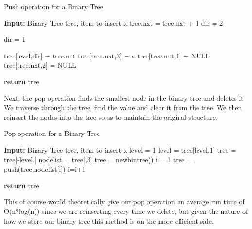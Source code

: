 \documentclass[11pt]{article}
\begin{document}
\begin{algorithm}[H]
    \caption{Push operation for a Binary Tree}
    \begin{algorithmic}[1]
        \State \textbf{Input: } Binary Tree tree, item to insert x
        \State tree.nxt = tree.nxt + 1
        \State
            \State dir = 2
        

            \State dir = 1
        
            \State tree[level,dir] = tree.nxt
            \State tree[tree.nxt,3] = x
            \State tree[tree.nxt,1] = NULL
            \State tree[tree.nxt,2] = NULL
        
        \EndIf
        
        \EndWhile 
        \State \textbf{return} tree
    \end{algorithmic}
\end{algorithm}

Next, the pop operation finds the smallest node in the binary tree and deletes it  We traverse through the tree, find the value and clear it from the tree. We then reinsert the nodes into the tree so as to maintain the original structure.

\begin{algorithm}[H]
    \caption{Pop operation for a Binary Tree}
    \begin{algorithmic}[1]
        \State \textbf{Input: } Binary Tree tree, item to insert x
        \State level = 1
        \State
            \State level = tree[level,1]
        \Else
            \State tree = tree[-level,]
            \State nodelist = tree[,3]
            \State tree = newbintree()
            \State i = 1
            \State {}
            \State 
            \State tree = push(tree,nodelist[i])
            \State i=i+1
            \Statte 
            \EndIF
            \EndWhile 
        
        \EndIf
        
        \EndWhile 
        \State \textbf{return} tree
    \end{algorithmic}
\end{algorithm}

This of course would theoretically give our pop operation an average run time of O(n*log(n)) since we are reinserting every time we delete, but given the nature of how we store our binary tree this method is on the more efficient side.
\end{document}
